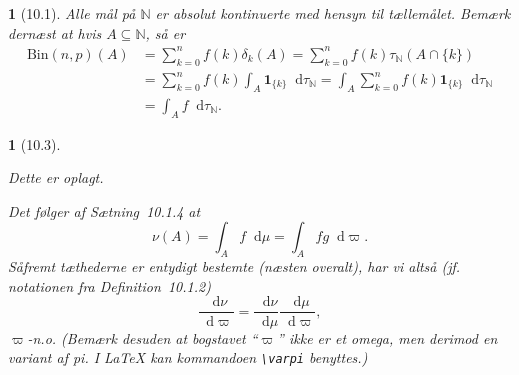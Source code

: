 \documentclass[a4paper, 11pt, article, danish, oneside]{memoir}
\newcommand{\naturals}{\mathbb{N}}
\newcommand{\dif}{\mathop{}\!\mathrm{d}}
\newcommand{\indicator}[1]{\mathbf{1}_{#1}}
\newcommand*\intersect\cap
\newcommand{\pencilsymbol}{\raisebox{-2pt}{\normalfont\PencilLeft}}
\theoremstyle{changedotcustomnumber}
\newtheorem{opgave}{\pencilsymbol}
\theoremstyle{changedotbreakcustomnumber}
\newtheorem{opgavebreak}{\pencilsymbol}
\begin{document}
\newcommand{\Bin}[2]{\mathrm{Bin}(#1,#2)}

\begin{opgave}[10.1]
    Alle mål på $\naturals$ er absolut kontinuerte med hensyn til tællemålet. Bemærk dernæst at hvis $A \subseteq \naturals$, så er
    \begin{align*}
        \Bin{n}{p}(A)
            &= \sum_{k=0}^n f(k) \delta_k(A)
             = \sum_{k=0}^n f(k) \tau_\naturals(A \intersect \{k\}) \\
            &= \sum_{k=0}^n f(k) \int_A \indicator{\{k\}} \dif\tau_\naturals
             = \int_A \sum_{k=0}^n f(k) \indicator{\{k\}} \dif\tau_\naturals \\
            &= \int_A f \dif\tau_\naturals.
    \end{align*}
\end{opgave}


\begin{opgavebreak}[10.3]
\begin{solutionsec}
    \item Dette er oplagt.

    \item Det følger af Sætning~10.1.4 at
    \begin{equation*}
        \nu(A)
            = \int_A f \dif\mu
            = \int_A fg \dif\varpi.
    \end{equation*}
    Såfremt tæthederne er entydigt bestemte (næsten overalt), har vi altså (jf. notationen fra Definition~10.1.2)
    \begin{equation*}
        \frac{\dif\nu}{\dif\varpi}
            = \frac{\dif\nu}{\dif\mu} \frac{\dif\mu}{\dif\varpi},
    \end{equation*}
    $\varpi$-n.o. (Bemærk desuden at bogstavet \enquote{$\varpi$} ikke er et omega, men derimod en variant af pi. I \LaTeX{} kan kommandoen \verb|\varpi| benyttes.)
\end{solutionsec}
\end{opgavebreak}
\end{document}

